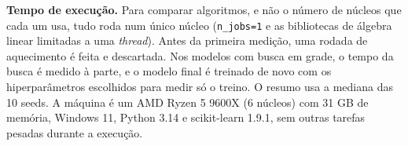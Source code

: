 \textbf{Tempo de execução.} Para comparar algoritmos, e não o número de núcleos que cada um usa, tudo roda num único núcleo (\texttt{n\_jobs=1} e as bibliotecas de álgebra linear limitadas a uma \emph{thread}). Antes da primeira medição, uma rodada de aquecimento é feita e descartada. Nos modelos com busca em grade, o tempo da busca é medido à parte, e o modelo final é treinado de novo com os hiperparâmetros escolhidos para medir só o treino. O resumo usa a mediana das 10 seeds. A máquina é um AMD Ryzen 5 9600X (6 núcleos) com 31 GB de memória, Windows 11, Python 3.14 e scikit-learn 1.9.1, sem outras tarefas pesadas durante a execução.
